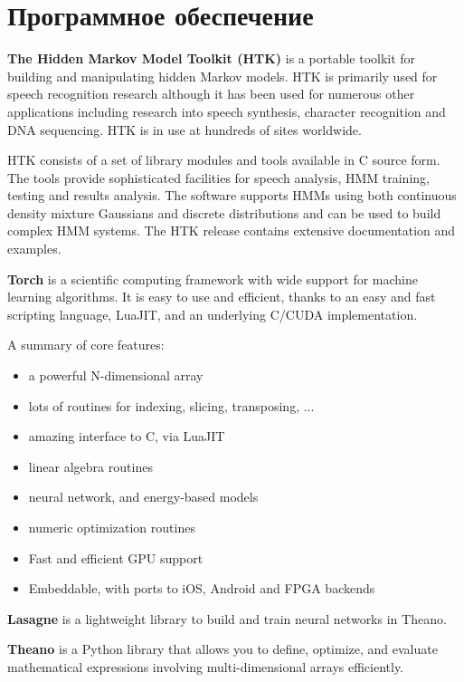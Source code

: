 \chapter{Программное обеспечение} \label{AppendixA}


\textbf{The Hidden Markov Model Toolkit (HTK)} is a portable toolkit for building and manipulating hidden Markov models. HTK is primarily used for speech recognition research although it has been used for numerous other applications including research into speech synthesis, character recognition and DNA sequencing. HTK is in use at hundreds of sites worldwide.

HTK consists of a set of library modules and tools available in C source form. The tools provide sophisticated facilities for speech analysis, HMM training, testing and results analysis. The software supports HMMs using both continuous density mixture Gaussians and discrete distributions and can be used to build complex HMM systems. The HTK release contains extensive documentation and examples. \cite{young2006htk}

\textbf{Torch} is a scientific computing framework with wide support for machine learning algorithms. It is easy to use and efficient, thanks to an easy and fast scripting language, LuaJIT, and an underlying C/CUDA implementation.

\noindent A summary of core features:
\begin{itemize}
  \item a powerful N-dimensional array
  \item lots of routines for indexing, slicing, transposing, ...
  \item amazing interface to C, via LuaJIT
  \item linear algebra routines
  \item neural network, and energy-based models
  \item numeric optimization routines
  \item Fast and efficient GPU support
  \item Embeddable, with ports to iOS, Android and FPGA backends
\end{itemize}

\textbf{Lasagne} is a lightweight library to build and train neural networks in Theano.

\textbf{Theano} is a Python library that allows you to define, optimize, and evaluate mathematical expressions involving multi-dimensional arrays efficiently.


